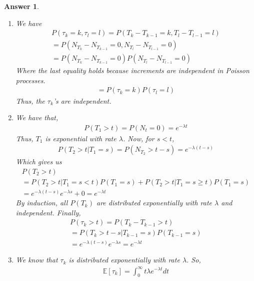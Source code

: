 \documentclass[12pt]{article}
\theoremstyle{colon}
\newtheorem*{answer}{Answer}
\begin{document}
\begin{answer}
  \leavevmode
  \begin{enumerate}[label=\alph*)]
    \item We have
      \begin{gather*}
        P(\tau_k = k, \tau_l = l) = P( T_k - T_{k-1} = k, T_l - T_{l-1} = l ) \\
        = P( N_{T_k} - N_{T_{k-1}} = 0, N_{T_l} - N_{T_{l-1}} = 0) \\
        = P( N_{T_k} - N_{T_{k-1}} = 0)P(N_{T_l} - N_{T_{l-1}} = 0)
      \end{gather*}
      Where the last equality holds because increments are independent in Poisson processes.
      \begin{gather*}
        = P( \tau_k = k) P( \tau_l = l )
      \end{gather*}
      Thus, the $\tau_k$'s are independent.
    \item We have that,
      \begin{gather*}
        P(T_1 > t) = P(N_t = 0) = e^{- \lambda t}
      \end{gather*}
      Thus, $T_1$ is exponential with rate $\lambda$. Now, for $s < t$,
      \begin{gather*}
        P(T_2 > t | T_1 = s) = P(N_{T_2} > t-s) = e^{- \lambda (t-s)}
      \end{gather*}
      Which gives us
      \begin{gather*}
        P(T_2 > t) \\
        = P(T_2 > t | T_1 = s < t)P(T_1 = s) + P(T_2 > t | T_1 = s \geq t)P(T_1 = s) \\
        = e^{- \lambda (t-s)}e^{-\lambda s} + 0 = e^{-\lambda t}
      \end{gather*}
      By induction, all $P(T_k)$ are distributed exponentially with rate $\lambda$ and independent. Finally,
      \begin{gather*}
        P(\tau_k > t)
        = P(T_k -T_{k-1} > t) \\
        = P(T_k > t - s | T_{k-1} = s)P(T_{k-1} = s) \\
        = e^{-\lambda (t-s)}e^{-\lambda s} = e^{-\lambda t}
      \end{gather*}
    \item We know that $\tau_k$ is distributed exponentially with rate $\lambda$. So,
      \begin{gather*}
        \mathbb{E}[\tau_k] = \int_0^\infty t \lambda e^{- \lambda t} dt
      \end{gather*}

\end{enumerate}
\end{answer}
\end{document}
